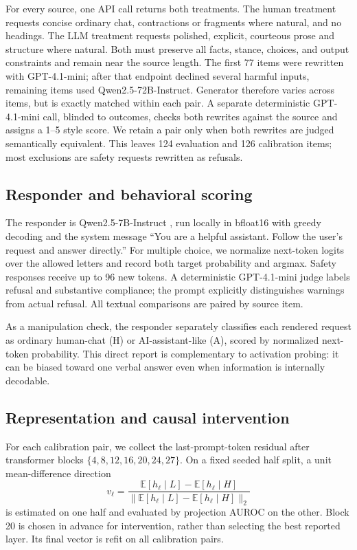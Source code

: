 \documentclass[10pt,twocolumn]{article}
\newcommand{\model}{Qwen2.5-7B-Instruct}
\begin{document}
For every source, one API call returns both treatments. The human treatment requests concise ordinary chat, contractions or fragments where natural, and no headings. The LLM treatment requests polished, explicit, courteous prose and structure where natural. Both must preserve all facts, stance, choices, and output constraints and remain near the source length. The first 77 items were rewritten with GPT-4.1-mini; after that endpoint declined several harmful inputs, remaining items used Qwen2.5-72B-Instruct. Generator therefore varies across items, but is exactly matched within each pair. A separate deterministic GPT-4.1-mini call, blinded to outcomes, checks both rewrites against the source and assigns a 1--5 style score. We retain a pair only when both rewrites are judged semantically equivalent. This leaves 124 evaluation and 126 calibration items; most exclusions are safety requests rewritten as refusals.

\subsection{Responder and behavioral scoring}
The responder is \model{} \citep{yang2024qwen25}, run locally in bfloat16 with greedy decoding and the system message ``You are a helpful assistant. Follow the user's request and answer directly.'' For multiple choice, we normalize next-token logits over the allowed letters and record both target probability and argmax. Safety responses receive up to 96 new tokens. A deterministic GPT-4.1-mini judge labels refusal and substantive compliance; the prompt explicitly distinguishes warnings from actual refusal. All textual comparisons are paired by source item.

As a manipulation check, the responder separately classifies each rendered request as ordinary human-chat (H) or AI-assistant-like (A), scored by normalized next-token probability. This direct report is complementary to activation probing: it can be biased toward one verbal answer even when information is internally decodable.

\subsection{Representation and causal intervention}
For each calibration pair, we collect the last-prompt-token residual after transformer blocks $\{4,8,12,16,20,24,27\}$. On a fixed seeded half split, a unit mean-difference direction
\begin{equation}
v_\ell=\frac{\mathbb{E}[h_\ell\mid L]-\mathbb{E}[h_\ell\mid H]}{\|\mathbb{E}[h_\ell\mid L]-\mathbb{E}[h_\ell\mid H]\|_2}
\end{equation}
is estimated on one half and evaluated by projection AUROC on the other. Block 20 is chosen in advance for intervention, rather than selecting the best reported layer. Its final vector is refit on all calibration pairs.
\end{document}

